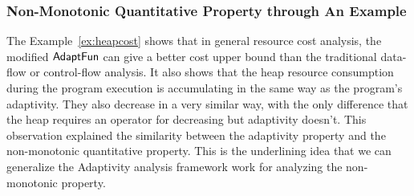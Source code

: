 \subsubsection{Non-Monotonic Quantitative Property through An Example}
\label{sec:nonmonotonic-example}
The Example~\ref{ex:heapcost} shows that in general 
resource cost analysis, the modified $\textsf{AdaptFun}$ can give a better cost upper bound than the traditional 
data-flow or control-flow analysis. It also shows that the heap resource consumption during the program 
execution is accumulating in the same way as the program's adaptivity. 
They also decrease in a very similar way,
with the only difference that the heap requires an operator for decreasing but adaptivity doesn't.
This observation explained the similarity between
the adaptivity property and the non-monotonic quantitative property. This is the underlining idea that we can generalize the Adaptivity analysis framework work for analyzing the non-monotonic property.



